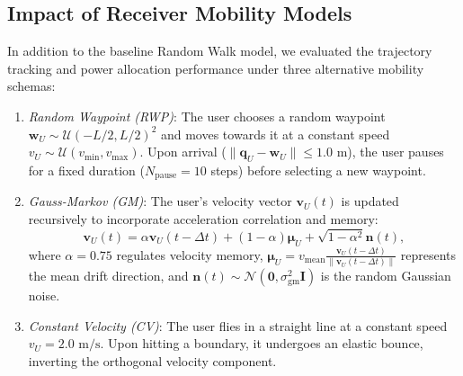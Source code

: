\documentclass[journal,onecolumn]{IEEEtran}
\begin{document}
\subsection{Impact of Receiver Mobility Models}
In addition to the baseline Random Walk model, we evaluated the trajectory tracking and power allocation performance under three alternative mobility schemas:
\begin{enumerate}
    \item \textit{Random Waypoint (RWP)}: The user chooses a random waypoint $\mathbf{w}_U \sim \mathcal{U}(-L/2, L/2)^2$ and moves towards it at a constant speed $v_U \sim \mathcal{U}(v_{\min}, v_{\max})$. Upon arrival ($\|\mathbf{q}_U - \mathbf{w}_U\| \le 1.0\text{ m}$), the user pauses for a fixed duration ($N_{\text{pause}} = 10$ steps) before selecting a new waypoint.
    \item \textit{Gauss-Markov (GM)}: The user's velocity vector $\mathbf{v}_U(t)$ is updated recursively to incorporate acceleration correlation and memory:
    \begin{equation}
        \mathbf{v}_U(t) = \alpha \mathbf{v}_U(t-\Delta t) + (1-\alpha)\boldsymbol{\mu}_U + \sqrt{1-\alpha^2}\mathbf{n}(t),
    \end{equation}
    where $\alpha = 0.75$ regulates velocity memory, $\boldsymbol{\mu}_U = v_{\text{mean}} \frac{\mathbf{v}_U(t-\Delta t)}{\|\mathbf{v}_U(t-\Delta t)\|}$ represents the mean drift direction, and $\mathbf{n}(t) \sim \mathcal{N}(\mathbf{0}, \sigma_{\text{gm}}^2 \mathbf{I})$ is the random Gaussian noise.
    \item \textit{Constant Velocity (CV)}: The user flies in a straight line at a constant speed $v_U = 2.0\text{ m/s}$. Upon hitting a boundary, it undergoes an elastic bounce, inverting the orthogonal velocity component.
\end{enumerate}
\end{document}
